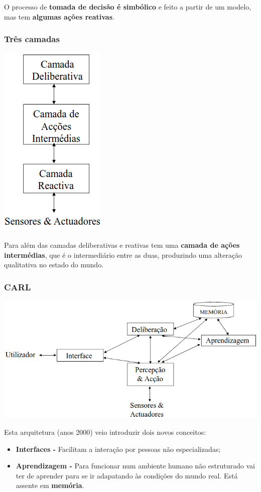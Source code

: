 \documentclass{article}
\begin{document}
O processo de \textbf{tomada de decisão é simbólico} e feito a partir de um modelo,
mas tem \textbf{algumas ações reativas}.

\pagebreak

\subsubsection{Três camadas}

\begin{center}
  \includegraphics[scale=0.35]{19}
\end{center}

Para além das camadas deliberativas e reativas tem uma \textbf{camada de ações intermédias},
que é o intermediário entre as duas, produzindo uma alteração qualitativa no estado do
mundo.

\subsubsection{CARL}

\begin{center}
  \includegraphics[scale=0.35]{20}
\end{center}

Esta arquitetura (anos 2000) veio introduzir dois novos conceitos:

\begin{itemize}
  \item \textbf{Interfaces -} Facilitam a interação por pessoas não especializadas;
  \item \textbf{Aprendizagem -} Para funcionar num ambiente humano não estruturado vai ter de aprender para se ir
  adapatando às condições do mundo real. Está assente em \textbf{memória}.
\end{itemize}
\end{document}
